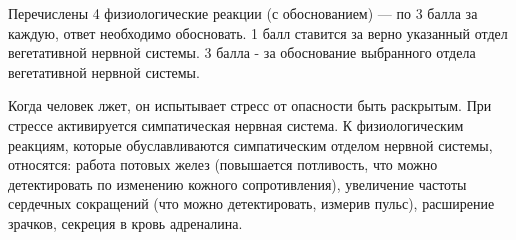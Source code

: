 \markSection

Перечислены 4 физиологические реакции (с обоснованием) — по 3 балла за каждую, ответ необходимо обосновать.  
1 балл ставится за верно указанный отдел вегетативной нервной системы.  
3 балла - за обоснование выбранного отдела вегетативной нервной системы.

\solutionSection

Когда человек лжет, он испытывает стресс от опасности быть раскрытым. При стрессе активируется симпатическая нервная система. К физиологическим реакциям, которые обуславливаются симпатическим отделом нервной системы, относятся: работа потовых желез (повышается потливость, что можно детектировать по изменению кожного сопротивления), увеличение частоты сердечных сокращений (что можно детектировать, измерив пульс), расширение зрачков, секреция в кровь адреналина.

